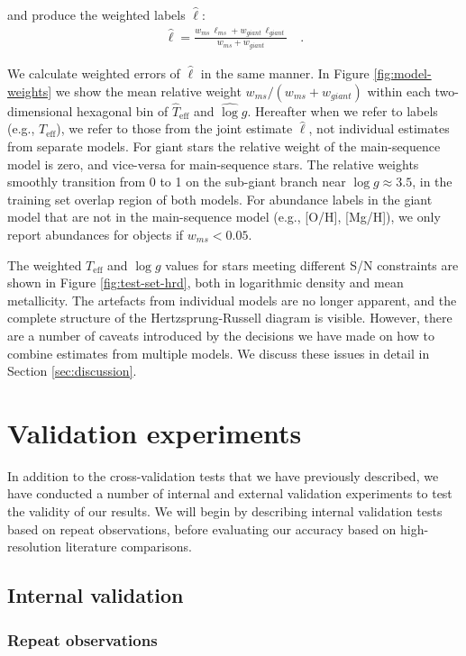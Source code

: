 \documentclass[preprint]{aastex}
\newcommand{\teff}{T_{\mathrm{eff}}}
\newcommand{\logg}{\log g}
\begin{document}
\noindent{}and produce the weighted labels $\hat\ell$:
\begin{eqnarray}
	\hat\ell = \frac{w_{ms}\,\ell_{ms} + w_{giant}\,\ell_{giant}}{w_{ms} + w_{giant}} \quad .
\end{eqnarray}

We calculate weighted errors of $\hat\ell$ in the same manner.  
In Figure \ref{fig:model-weights} we show the mean relative
weight $w_{ms}/(w_{ms} + w_{giant})$ within each two-dimensional hexagonal bin of 
$\hat\teff$ and $\hat\logg$.  Hereafter when we refer to labels (e.g., $\teff$),
we refer to those from the joint estimate $\hat\ell$, not individual estimates 
from separate models.  For giant stars the relative weight of 
the main-sequence model is zero, and vice-versa for main-sequence stars.
The relative weights smoothly transition from 0 to 1 on the sub-giant branch
near $\log{g} \approx 3.5$, in the training set overlap region of both models.
For abundance labels in the giant model that are not in the main-sequence
model (e.g., [O/H], [Mg/H]), we only report abundances for objects if
$w_{ms} < 0.05$.


The weighted $\teff$ and $\logg$ values for stars meeting different S/N 
constraints are shown in Figure \ref{fig:test-set-hrd}, both in logarithmic 
density and mean metallicity.  The artefacts from individual models are no 
longer apparent, and the complete structure of the Hertzsprung-Russell diagram
is visible.  However, there are a number of caveats introduced by the decisions
we have made on how to combine estimates from multiple models. We discuss these 
issues in detail in Section \ref{sec:discussion}.


\section{Validation experiments}
\label{sec:validation}


In addition to the cross-validation tests that we have previously described, 
we have conducted a number of internal and external validation experiments to 
test the validity of our results.  We will begin by describing internal validation
tests based on repeat observations, before evaluating our accuracy based on
high-resolution literature comparisons.


\subsection{Internal validation}
\subsubsection{Repeat observations}
\label{sec:repeat-observations}
\end{document}
